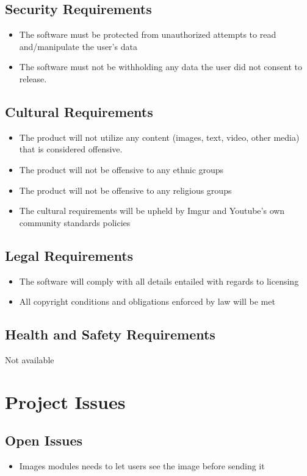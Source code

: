 \documentclass[12pt, titlepage]{article}
\begin{document}
\subsection{Security Requirements}
\begin{itemize}
\item The software must be protected from unauthorized attempts to read and/manipulate the user’s data
\item The software must not be withholding any data the user did not consent to release.
\end{itemize}

\subsection{Cultural Requirements}
\begin{itemize}
\item The product will not utilize any content (images, text, video, other media) that is considered offensive.
\item The product will not be offensive to any ethnic groups
\item The product will not be offensive to any religious groups
\color{blue}
\item The cultural requirements will be upheld by Imgur and Youtube's own community standards policies
\end{itemize}
\subsection{Legal Requirements}
\begin{itemize}
\item The software will comply with all details entailed with regards to licensing 
\item All copyright conditions and obligations enforced by law will be met 
\end{itemize}
\subsection{Health and Safety Requirements}
\color{blue} Not available
\color{black}

\section{Project Issues}

\subsection{Open Issues}
\begin{itemize}
\color{blue}
\item Images modules needs to let users see the image before sending it
\color{black}
\end{itemize}
\end{document}
